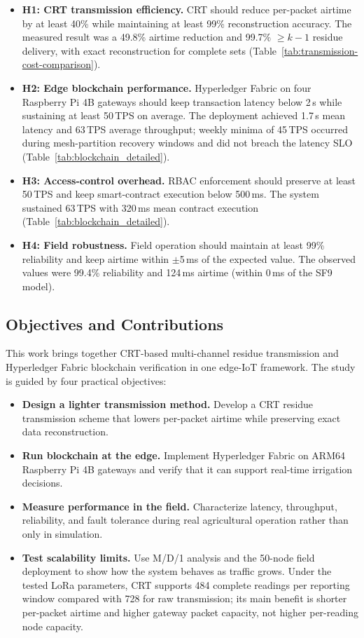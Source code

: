 \documentclass[pdflatex,sn-mathphys-num]{sn-jnl}
\theoremstyle{thmstyleone}
\theoremstyle{thmstyletwo}
\theoremstyle{thmstylethree}
\begin{document}
\begin{itemize}
    \item \textbf{H1: CRT transmission efficiency.} CRT should reduce per-packet airtime by at least 40\% while maintaining at least 99\% reconstruction accuracy. The measured result was a 49.8\% airtime reduction and 99.7\% $\geq k{-}1$ residue delivery, with exact reconstruction for complete sets (Table~\ref{tab:transmission-cost-comparison}).
    \item \textbf{H2: Edge blockchain performance.} Hyperledger Fabric on four Raspberry Pi 4B gateways should keep transaction latency below 2\,s while sustaining at least 50\,TPS on average. The deployment achieved 1.7\,s mean latency and 63\,TPS average throughput; weekly minima of 45\,TPS occurred during mesh-partition recovery windows and did not breach the latency SLO (Table~\ref{tab:blockchain_detailed}).
    \item \textbf{H3: Access-control overhead.} RBAC enforcement should preserve at least 50\,TPS and keep smart-contract execution below 500\,ms. The system sustained 63\,TPS with 320\,ms mean contract execution (Table~\ref{tab:blockchain_detailed}).
    \item \textbf{H4: Field robustness.} Field operation should maintain at least 99\% reliability and keep airtime within $\pm$5\,ms of the expected value. The observed values were 99.4\% reliability and 124\,ms airtime (within 0\,ms of the SF9 model).
\end{itemize}

\subsection{Objectives and Contributions}
\label{subsec:objectives_contributions}

This work brings together CRT-based multi-channel residue transmission and Hyperledger Fabric blockchain verification in one edge-IoT framework. The study is guided by four practical objectives:

\begin{itemize}
    \item \textbf{Design a lighter transmission method.} Develop a CRT residue transmission scheme that lowers per-packet airtime while preserving exact data reconstruction.
    \item \textbf{Run blockchain at the edge.} Implement Hyperledger Fabric on ARM64 Raspberry Pi 4B gateways and verify that it can support real-time irrigation decisions.
    \item \textbf{Measure performance in the field.} Characterize latency, throughput, reliability, and fault tolerance during real agricultural operation rather than only in simulation.
    \item \textbf{Test scalability limits.} Use M/D/1 analysis and the 50-node field deployment to show how the system behaves as traffic grows. Under the tested LoRa parameters, CRT supports 484 complete readings per reporting window compared with 728 for raw transmission; its main benefit is shorter per-packet airtime and higher gateway packet capacity, not higher per-reading node capacity.
\end{itemize}
\end{document}
